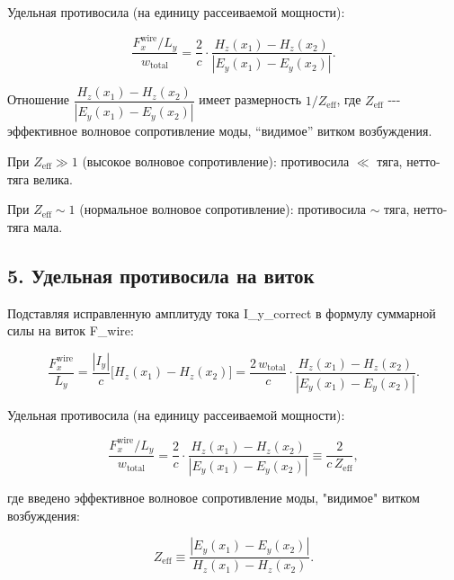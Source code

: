 \documentclass[11pt]{article}
\begin{document}
Удельная противосила (на единицу рассеиваемой мощности):

\begin{equation}
    \boxed{
        \frac{F_x^{\mathrm{wire}}/L_y}{w_{\mathrm{total}}}
        = \frac{2}{c}\cdot
          \frac{H_z(x_1) - H_z(x_2)}{|E_y(x_1) - E_y(x_2)|}.
    }
    \label{eq:specific_counter_correct}
\end{equation}

Отношение \(\dfrac{H_z(x_1) - H_z(x_2)}{|E_y(x_1) - E_y(x_2)|}\) имеет
размерность \(1/Z_{\mathrm{eff}}\), где \(Z_{\mathrm{eff}}\) -\/-\/-
эффективное волновое сопротивление моды, ``видимое'' витком возбуждения.

При \(Z_{\mathrm{eff}} \gg 1\) (высокое волновое сопротивление):
противосила \(\ll\) тяга, нетто-тяга велика.

При \(Z_{\mathrm{eff}} \sim 1\) (нормальное волновое сопротивление):
противосила \(\sim\) тяга, нетто-тяга мала.

    \subsection{5. Удельная противосила на
виток}\label{ux443ux434ux435ux43bux44cux43dux430ux44f-ux43fux440ux43eux442ux438ux432ux43eux441ux438ux43bux430-ux43dux430-ux432ux438ux442ux43eux43a}

Подставляя исправленную амплитуду тока I\_y\_correct в формулу суммарной
силы на виток F\_wire:

\begin{equation*}
    \frac{F_x^{\mathrm{wire}}}{L_y}
    = \frac{|I_y|}{c}\bigl[H_z(x_1) - H_z(x_2)\bigr]
    = \frac{2\,w_{\mathrm{total}}}{c}\cdot
      \frac{H_z(x_1) - H_z(x_2)}{|E_y(x_1) - E_y(x_2)|}.
\end{equation*}

Удельная противосила (на единицу рассеиваемой мощности):

\begin{equation}
    \boxed{
        \frac{F_x^{\mathrm{wire}}/L_y}{w_{\mathrm{total}}}
        = \frac{2}{c}\cdot
          \frac{H_z(x_1) - H_z(x_2)}{|E_y(x_1) - E_y(x_2)|}
        \equiv \frac{2}{c\,Z_{\mathrm{eff}}},
    }
    \label{eq:specific_counter}
\end{equation}

где введено эффективное волновое сопротивление моды, "видимое" витком
возбуждения:

\begin{equation}
    Z_{\mathrm{eff}}
    \equiv \frac{|E_y(x_1) - E_y(x_2)|}{H_z(x_1) - H_z(x_2)}.
    \label{eq:Z_eff}
\end{equation}
\end{document}
